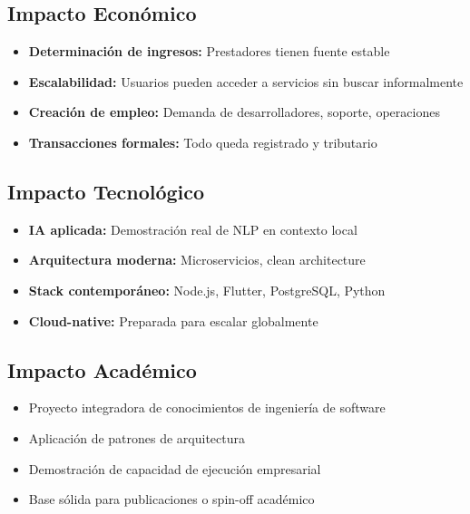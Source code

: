 \documentclass[12pt,a4paper,spanish]{article}
\begin{document}
\subsection{Impacto Económico}

\begin{itemize}
    \item \textbf{Determinación de ingresos:} Prestadores tienen fuente estable
    \item \textbf{Escalabilidad:} Usuarios pueden acceder a servicios sin buscar informalmente
    \item \textbf{Creación de empleo:} Demanda de desarrolladores, soporte, operaciones
    \item \textbf{Transacciones formales:} Todo queda registrado y tributario
\end{itemize}

\subsection{Impacto Tecnológico}

\begin{itemize}
    \item \textbf{IA aplicada:} Demostración real de NLP en contexto local
    \item \textbf{Arquitectura moderna:} Microservicios, clean architecture
    \item \textbf{Stack contemporáneo:} Node.js, Flutter, PostgreSQL, Python
    \item \textbf{Cloud-native:} Preparada para escalar globalmente
\end{itemize}

\subsection{Impacto Académico}

\begin{itemize}
    \item Proyecto integradora de conocimientos de ingeniería de software
    \item Aplicación de patrones de arquitectura
    \item Demostración de capacidad de ejecución empresarial
    \item Base sólida para publicaciones o spin-off académico
\end{itemize}

\newpage

\end{document}
